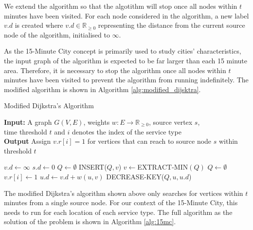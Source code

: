 We extend the algorithm so that the algotithm will stop once all nodes within $t$ minutes have been visited. For each node considered in the algorithm, a new label $v.d$ is created where $v.d \in \mathbb{R}_{\geq 0}$ representing the distance from the current source node of the algorithm, initialised to $\infty$.

As the 15-Minute City concept is primarily used to study cities' characteristics, the input graph of the algorithm is expected to be far larger than each 15 minute area. Therefore, it is necessary to stop the algorithm once all nodes within $t$ minutes have been visited to prevent the algorithm from running indefinitely. The modified algorithm is shown in Algorithm \ref{alg:modified_dijsktra}.

\begin{algorithm}[H]
    \caption{Modified Dijkstra's Algorithm} \label{alg:modified_dijsktra}
    \textbf{Input:} A graph $G(V,E)$, weights $w:E\rightarrow\mathbb{R}_{\geq 0}$, source vertex $s$, \\  time threshold $t$ and $i$ denotes the index of the service type\\
    \textbf{Output} Assign $v.r[i]=1$ for vertices that can reach to source node $s$ within threshold $t$ %
    \begin{algorithmic}
            \State $v.d\gets\infty$
        \EndFor
        \State $s.d\gets 0$
        \State $Q\gets\emptyset$
            \State INSERT($Q,v$)
        \EndFor
            \State $v\gets$EXTRACT-MIN$(Q)$
                \State $Q\gets\emptyset$ 
            \Else
                \State $v.r[i] \gets 1 $
                        \State $u.d\gets v.d+w(u,v)$
                        \State DECREASE-KEY($Q,u,u.d$)
                    \EndIf
                \EndFor
            \EndIf
        \EndWhile
    \end{algorithmic}
\end{algorithm}

The modified Dijkstra's algorithm shown above only searches for vertices within $t$ minutes from a single source node. For our context of the 15-Minute City, this needs to run for each location of each service type. The full algorithm as the solution of the problem is shown in Algorithm \ref{alg:15mc}.

